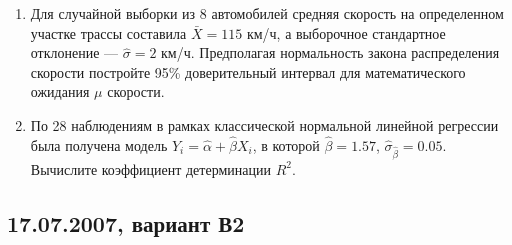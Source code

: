 \documentclass[pdftex,12pt,a4paper]{article}
\begin{document}
\begin{enumerate}
\item Для случайной выборки из 8 автомобилей средняя скорость на определенном участке трассы составила $\bar{X}=115$ км/ч, а выборочное стандартное отклонение --- $\hat{\sigma}=2$ км/ч. Предполагая нормальность закона распределения скорости постройте 95\% доверительный интервал для математического ожидания $\mu$ скорости.
\item По 28 наблюдениям в рамках классической нормальной линейной регрессии была получена модель $\hat{Y}_i=\hat{\alpha}+\hat{\beta}X_i$, в которой $\hat{\beta}=1.57$, $\hat{\sigma}_{\hat{\beta}}=0.05$. Вычислите коэффициент детерминации $R^2$.
\end{enumerate}

\subsection{17.07.2007, вариант В2}
\end{document}
